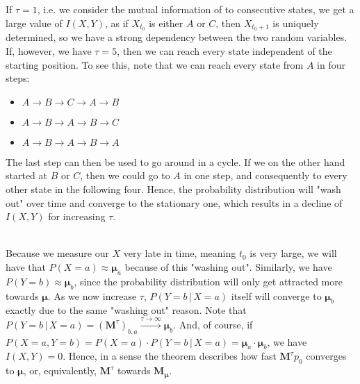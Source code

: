 \documentclass[../../main.tex]{subfiles}
\begin{document}
    \noindent
    If $\tau = 1$, i.e. we consider the mutual information of to consecutive states, we get a large value of $I(X, Y)$, as if $X_{t_0}$ is either $A$ or $C$, then $X_{t_0+1}$ is uniquely determined, so we have a strong dependency between the two random variables. If, however, we have $\tau = 5$, then we can reach every state independent of the starting position. To see this, note that we can reach every state from $A$ in four steps:
    \begin{itemize}
        \item $A \rightarrow B \rightarrow C \rightarrow A \rightarrow B$
        \item $A \rightarrow B \rightarrow A \rightarrow B \rightarrow C$
        \item $A \rightarrow B \rightarrow A \rightarrow B \rightarrow A$
    \end{itemize}
    The last step can then be used to go around in a cycle. If we on the other hand started at $B$ or $C$, then we could go to $A$ in one step, and consequently to every other state in the following four. Hence, the probability distribution will "wash out" over time and converge to the stationary one, which results in a decline of $I(X, Y)$ for increasing $\tau$.
    
    ~\\
    Because we measure our $X$ very late in time, meaning $t_0$ is very large, we will have that $P(X = a) \approx \boldsymbol{\mu}_a$ because of this "washing out". Similarly, we have $P(Y = b) \approx \boldsymbol{\mu}_b$, since the probability distribution will only get attracted more towards $\boldsymbol{\mu}$. As we now increase $\tau$, $P(Y = b \,|\, X = a)$ itself will converge to $\boldsymbol{\mu}_b$ exactly due to the same "washing out" reason. Note that $P(Y = b \,|\, X = a) = (\boldsymbol{M}^{\tau})_{b,a} \xrightarrow{\tau \to \infty}  \boldsymbol{\mu}_b$. And, of course, if $P(X = a, Y = b) = P(X = a) \cdot P(Y = b \,|\, X = a) = \boldsymbol{\mu}_a \cdot \boldsymbol{\mu}_b$, we have $I(X, Y) = 0$. Hence, in a sense the theorem describes how fast $\boldsymbol{M}^{\tau} p_0$ converges to $\boldsymbol{\mu}$, or, equivalently, $\boldsymbol{M}^{\tau}$ towards $\boldsymbol{M}_{\boldsymbol{\mu}}$.
\end{document}
